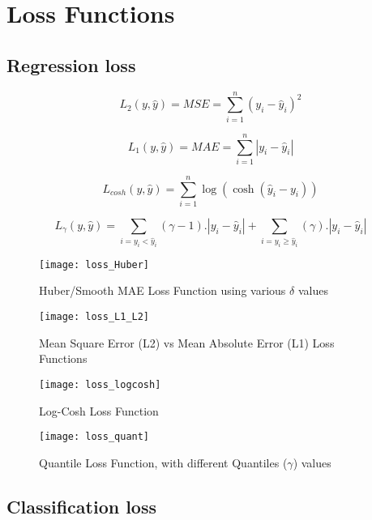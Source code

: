 \section{Loss Functions}

\subsection{Regression loss}

\begin{equation}
	L_2(y, \hat{y}) = MSE = \sum\limits_{i=1}^n  {(y_i - \hat{y}_i)}^2
\end{equation}

\begin{equation}
	L_1(y, \hat{y}) = MAE = \sum\limits_{i=1}^n  {|y_i - \hat{y}_i|}
\end{equation}

\begin{equation}
	L_{cosh}(y, \hat{y}) = \sum\limits_{i=1}^n  {\log(\cosh(\hat{y}_i-y_i))}
\end{equation}

\begin{equation}
	L_\gamma(y, \hat{y}) = \sum\limits_{i=y_i<\hat{y}_i}  ({\gamma-1}).|y_i - \hat{y}_i| + \sum\limits_{i=y_i\geq \hat{y}_i}  ({\gamma}).|y_i - \hat{y}_i|
\end{equation}



\begin{figure}
	\centerline{
		\texttt{[image: loss\_Huber]}}
	\caption{Huber/Smooth MAE Loss Function using various $\delta$ values}
	\label{fig:Loss Huber}
\end{figure}

\begin{figure}
	\centerline{
		\texttt{[image: loss\_L1\_L2]}}
	\caption{Mean Square Error (L2) vs Mean Absolute Error (L1) Loss Functions}
	\label{fig:Loss L1 L2}
\end{figure}

\begin{figure}
	\centerline{
		\texttt{[image: loss\_logcosh]}}
	\caption{Log-Cosh Loss Function}
	\label{fig:Loss L1 L2}
\end{figure}

\begin{figure}
	\centerline{
		\texttt{[image: loss\_quant]}}
	\caption{Quantile Loss Function, with different Quantiles ($\gamma$) values}
	\label{fig:Loss L1 L2}
\end{figure}

\subsection{Classification loss}